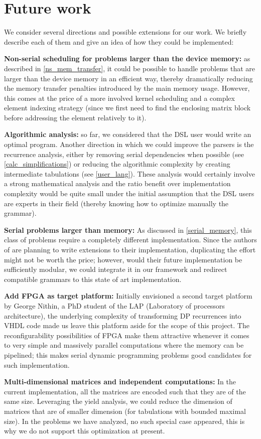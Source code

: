 \section{Future work}
We consider several directions and possible extensions for our work. We briefly describe each of them and give an idea of how they could be implemented:\ol
\item \textbf{Non-serial scheduling for problems larger than the device memory:} as described in \ref{ns_mem_transfer}, it could be possible to handle problems that are larger than the device memory in an efficient way, thereby dramatically reducing the memory transfer penalties introduced by the main memory usage. However, this comes at the price of a more involved kernel scheduling and a complex element indexing strategy (since we first need to find the enclosing matrix block before addressing the element relatively to it).
\item \textbf{Algorithmic analysis:} so far, we considered that the DSL user would write an optimal program. Another direction in which we could improve the parsers is the recurrence analysis, either by removing serial dependencies when possible (see \ref{calc_simplifications}) or reducing the algorithmic complexity by creating intermediate tabulations (see \ref{user_lang}). These analysis would certainly involve a strong mathematical analysis and the ratio benefit over implementation complexity would be quite small under the initial assumption that the DSL users are experts in their field (thereby knowing how to optimize manually the grammar).
\item \textbf{Serial problems larger than memory:} As discussed in \ref{serial_memory}, this class of problems require a completely different implementation. Since the authors of \cite{swat_mega} are planning to write extensions to their implementation, duplicating the effort might not be worth the price; however, would their future implementation be sufficiently modular, we could integrate it in our framework and redirect compatible grammars to this state of art implementation.
\item \textbf{Add FPGA as target platform:} Initially envisioned a second target platform by George Nithin, a PhD student of the LAP (Laboratory of processors architecture), the underlying complexity of transforming DP recurrences into VHDL code made us leave this platform aside for the scope of this project. The reconfigurability possibilities of FPGA make them attractive whenever it comes to very simple and massively parallel computations where the memory can be pipelined; this makes serial dynamic programming problems good candidates for such implementation.
\item \textbf{Multi-dimensional matrices and independent computations:} In the current implementation, all the matrices are encoded such that they are of the same size. Leveraging the yield analysis, we could reduce the dimension of matrices that are of smaller dimension (for tabulations with bounded maximal size). In the problems we have analyzed, no such special case appeared, this is why we do not support this optimization at present.

